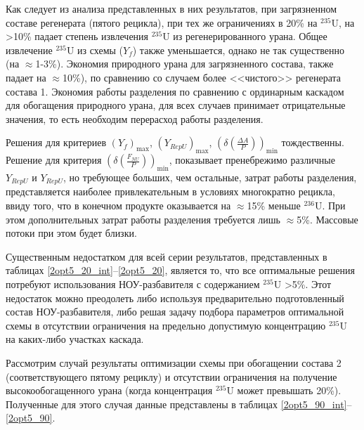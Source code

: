 Как следует из анализа представленных в них результатов, при загрязненном составе регенерата (пятого рецикла), при тех же ограничениях в 20\% на $^{235}$U, на >10\% падает степень извлечения $^{235}$U из регенерированного урана. Общее извлечение  $^{235}$U из схемы ($Y_f$) также уменьшается, однако не так существенно (на $\approx$1-3\%). Экономия природного урана для загрязненного состава, также падает на $\approx$10\%), по сравнению со случаем более <<чистого>> регенерата состава 1. Экономия работы разделения по сравнению с ординарным каскадом для обогащения природного урана, для всех случаев принимает отрицательные значения, то есть необходим перерасход работы разделения.

Решения для критериев $(Y_f)_\text{max}$, $(Y_{RepU})_\text{max}$, $(\delta(\frac{\Delta A}{P}))_\text{min}$ тождественны. Решение для критерия $(\delta(\frac{F_{NU}}{P}))_\text{min}$, показывает пренебрежимо различные $Y_{RepU}$ и $Y_{RepU}$, но требующее больших, чем остальные, затрат работы разделения, представляется наиболее привлекательным в условиях многократно рецикла, ввиду того, что в конечном продукте оказывается на $\approx$15\% меньше $^{236}$U. При этом дополнительных затрат работы разделения требуется лишь $\approx$5\%. Массовые потоки при этом будет близки.

Существенным недостатком для всей серии результатов, представленных в таблицах \ref*{2opt5_20_int}--\ref*{2opt5_20}, является то, что все оптимальные решения потребуют использования НОУ-разбавителя с содержанием $^{235}$U >5\%. Этот недостаток можно преодолеть либо используя предварительно подготовленный состав НОУ-разбавителя, либо решая задачу подбора параметров оптимальной схемы в отсутствии ограничения на предельно допустимую концентрацию $^{235}$U на каких-либо участках каскада.

Рассмотрим случай результаты оптимизации схемы при обогащении состава 2 (соответствующего пятому рециклу) и отсутствии ограничения на получение высокообогащенного урана (когда концентрация $^{235}$U может превышать 20\%). Полученные для этого случая данные представлены в таблицах \ref*{2opt5_90_int}--\ref*{2opt5_90}.

